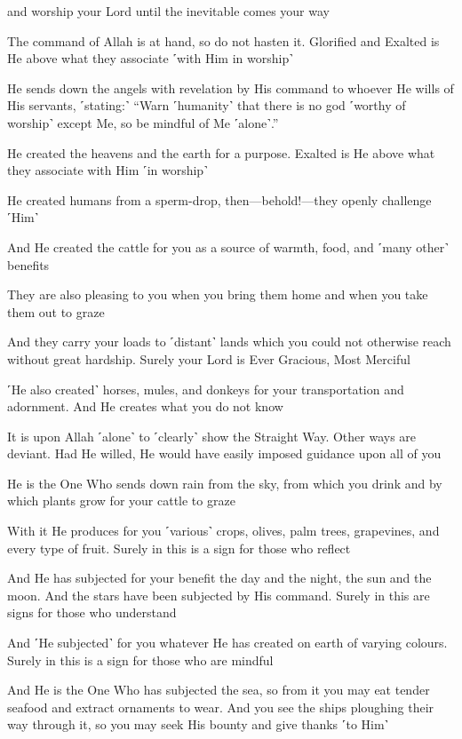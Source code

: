 and worship your Lord until the inevitable comes your way

The command of Allah is at hand, so do not hasten it. Glorified and Exalted is He above what they associate ˹with Him in worship˺

He sends down the angels with revelation by His command to whoever He wills of His servants, ˹stating:˺ “Warn ˹humanity˺ that there is no god ˹worthy of worship˺ except Me, so be mindful of Me ˹alone˺.”

He created the heavens and the earth for a purpose. Exalted is He above what they associate with Him ˹in worship˺

He created humans from a sperm-drop, then—behold!—they openly challenge ˹Him˺

And He created the cattle for you as a source of warmth, food, and ˹many other˺ benefits

They are also pleasing to you when you bring them home and when you take them out to graze

And they carry your loads to ˹distant˺ lands which you could not otherwise reach without great hardship. Surely your Lord is Ever Gracious, Most Merciful

˹He also created˺ horses, mules, and donkeys for your transportation and adornment. And He creates what you do not know

It is upon Allah ˹alone˺ to ˹clearly˺ show the Straight Way. Other ways are deviant. Had He willed, He would have easily imposed guidance upon all of you

He is the One Who sends down rain from the sky, from which you drink and by which plants grow for your cattle to graze

With it He produces for you ˹various˺ crops, olives, palm trees, grapevines, and every type of fruit. Surely in this is a sign for those who reflect

And He has subjected for your benefit the day and the night, the sun and the moon. And the stars have been subjected by His command. Surely in this are signs for those who understand

And ˹He subjected˺ for you whatever He has created on earth of varying colours. Surely in this is a sign for those who are mindful

And He is the One Who has subjected the sea, so from it you may eat tender seafood and extract ornaments to wear. And you see the ships ploughing their way through it, so you may seek His bounty and give thanks ˹to Him˺

